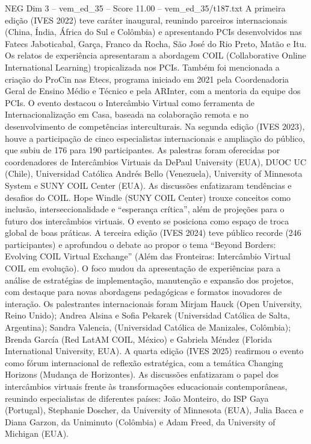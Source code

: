 \begin{textsample}{NEG Dim 3 – vem\_ed\_35 – Score 11.00 – vem\_ed\_35/t187.txt}
A primeira edição (IVES 2022) teve caráter inaugural, reunindo parceiros internacionais (China, Índia, África do Sul e Colômbia) e apresentando PCIs desenvolvidos nas Fatecs Jaboticabal, Garça, Franco da Rocha, São José do Rio Preto, Matão e Itu.
Os relatos de experiência apresentaram a abordagem COIL (Collaborative Online International Learning) tropicalizada nos PCIs.
Também foi mencionada a criação do ProCin nas Etecs, programa iniciado em 2021 pela Coordenadoria Geral de Ensino Médio e Técnico e pela ARInter, com a mentoria da equipe dos PCIs.
O evento destacou o Intercâmbio Virtual como ferramenta de Internacionalização em Casa, baseada na colaboração remota e no desenvolvimento de competências interculturais.
Na segunda edição (IVES 2023), houve a participação de cinco especialistas internacionais e ampliação do público, que subiu de 176 para 190 participantes.
As palestras foram oferecidas por coordenadores de Intercâmbios Virtuais da DePaul University (EUA), DUOC UC (Chile), Universidad Católica Andrés Bello (Venezuela), University of Minnesota System e SUNY COIL Center (EUA).
As discussões enfatizaram tendências e desafios do COIL.
Hope Windle (SUNY COIL Center) trouxe conceitos como inclusão, interseccionalidade e “esperança crítica”, além de projeções para o futuro dos intercâmbios virtuais.
O evento se posiciona como espaço de troca global de boas práticas.
A terceira edição (IVES 2024) teve público recorde (246 participantes) e aprofundou o debate ao propor o tema “Beyond Borders: Evolving COIL Virtual Exchange” (Além das Fronteiras: Intercâmbio Virtual COIL em evolução).
O foco mudou da apresentação de experiências para a análise de estratégias de implementação, manutenção e expansão dos projetos, com destaque para novas abordagens pedagógicas e formatos inovadores de interação.
Os palestrantes internacionais foram Mirjam Hauck (Open University, Reino Unido); Andrea Alsina e Sofia Pekarek (Universidad Católica de Salta, Argentina); Sandra Valencia, (Universidad Católica de Manizales, Colômbia); Brenda García (Red LatAM COIL, México) e Gabriela Méndez (Florida International University, EUA).
A quarta edição (IVES 2025) reafirmou o evento como fórum internacional de reflexão estratégica, com a temática Changing Horizons (Mudança de Horizontes).
As discussões enfatizaram o papel dos intercâmbios virtuais frente às transformações educacionais contemporâneas, reunindo especialistas de diferentes países: João Monteiro, do ISP Gaya (Portugal), Stephanie Doscher, da University of Minnesota (EUA), Julia Bacca e Diana Garzon, da Uniminuto (Colômbia) e Adam Freed, da University of Michigan (EUA).

\end{textsample}
